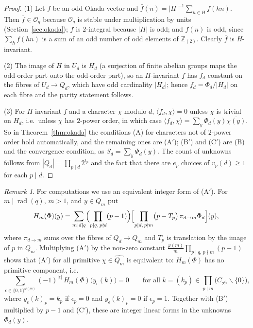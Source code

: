 \documentclass[11pt]{amsart}
\theoremstyle{definition}
\theoremstyle{remark}
\newtheorem{remark}[theorem]{Remark}
\newcommand{\Zt}{\mathbb Z_{(2)}}
\newcommand{\Ok}{\mathcal O}
\newcommand{\ip}[2]{\langle #1,#2\rangle}
\DeclareMathOperator{\rad}{rad}
\numberwithin{equation}{section}
\begin{document}
\begin{proof}
(1) Let $f$ be an odd Okada vector and $\bar f(n)=|H|^{-1}\sum_{h\in H}f(hn)$.
Then $\bar f\in\Ok_q$ because $\Ok_q$ is stable under multiplication by units (Section~\ref{sec:okada}); $\bar f$ is $2$-integral because $|H|$ is odd; and $\bar f(n)$ is odd, since $\sum_hf(hn)$ is a sum of an odd number of odd elements of $\Zt$.
Clearly $\bar f$ is $H$-invariant.

(2) The image of $H$ in $U_d$ is $H_d$ (a surjection of finite abelian groups maps the odd-order part onto the odd-order part), so an $H$-invariant $f$ has $f_d$ constant on the fibres of $U_d\to Q_d$, which have odd cardinality $|H_d|$; hence $f_d=\Phi_d/|H_d|$ on each fibre and the parity statement follows.

(3) For $H$-invariant $f$ and a character $\chi$ modulo $d$, $\ip{f_d}{\chi}=0$ unless $\chi$ is trivial on $H_d$, i.e.\ unless $\chi$ has $2$-power order, in which case $\ip{f_d}{\chi}=\sum_y\Phi_d(y)\overline{\chi(y)}$.
So in Theorem~\ref{thm:okada} the conditions (A) for characters not of $2$-power order hold automatically, and the remaining ones are (A$'$); (B$'$) and (C$'$) are (B) and the convergence condition, as $S_d=\sum_y\Phi_d(y)$.
The count of unknowns follows from $|Q_d|=\prod_{p\mid d}2^{t_p}$ and the fact that there are $e_p$ choices of $v_p(d)\ge1$ for each $p\mid d$.
\end{proof}

\begin{remark}\label{rem:integer-form}
For computations we use an equivalent integer form of (A$'$).
For $m\mid\rad(q)$, $m>1$, and $y\in Q_m$ put
\[
H_m(\Phi)(y)=\sum_{m\mid d\mid q}\Bigl(\prod_{p\mid q,\,p\nmid d}(p-1)\Bigr)\Bigl[\prod_{p\mid d,\,p\nmid m}\bigl(p-T_p\bigr)\,\pi_{d\to m}\Phi_d\Bigr](y),
\]
where $\pi_{d\to m}$ sums over the fibres of $Q_d\to Q_m$ and $T_p$ is translation by the image of $p$ in $Q_m$.
Multiplying (A$'$) by the non-zero constant $\frac{\varphi(m)}{m}\prod_{p\mid q,\,p\nmid m}(p-1)$ shows that (A$'$) for all primitive $\chi\in\widehat{Q_m}$ is equivalent to: $H_m(\Phi)$ has no primitive component, i.e.
\[
\sum_{\epsilon\in\{0,1\}^{\omega(m)}}(-1)^{|\epsilon|}\,H_m(\Phi)\bigl(y_\epsilon(k)\bigr)=0\qquad\text{for all }k=(k_p)\in\prod_{p\mid m}\bigl(C_{2^{t_p}}\smallsetminus\{0\}\bigr),
\]
where $y_\epsilon(k)_p=k_p$ if $\epsilon_p=0$ and $y_\epsilon(k)_p=0$ if $\epsilon_p=1$.
Together with (B$'$) multiplied by $p-1$ and (C$'$), these are integer linear forms in the unknowns $\Phi_d(y)$.
\end{remark}
\end{document}
